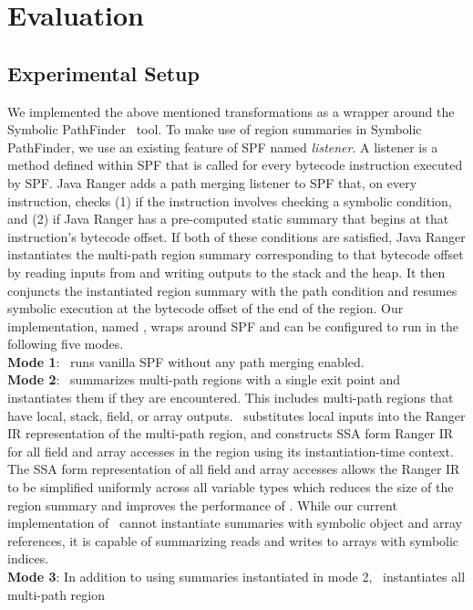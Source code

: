 \section{Evaluation}
\label{sec:results}
\subsection{Experimental Setup}
We implemented the above mentioned transformations as a wrapper around the Symbolic PathFinder~\cite{spf} tool.
%
To make use of region summaries in Symbolic PathFinder, we use an existing feature of SPF named \textit{listener}.
%
A listener is a method defined within SPF that is called for every bytecode instruction executed by SPF.
%
Java Ranger adds a path merging listener to SPF that, on every instruction, checks (1) if the instruction involves
checking a symbolic condition, and (2) if Java Ranger has a pre-computed static summary that begins at that
instruction\rq s bytecode offset.
%
If both of these conditions are satisfied, Java Ranger instantiates the multi-path region summary corresponding to that
bytecode offset by reading inputs from and writing outputs to the stack and the heap.
%
It then conjuncts the instantiated region summary with the path condition and resumes symbolic execution at the
bytecode offset of the end of the region.
%
Our implementation, named \tool, wraps around SPF and can be configured to run in the following five modes.\\
%
\textbf{Mode 1}: \tool\ runs vanilla SPF without any path merging enabled.\\
%
\textbf{Mode 2}: \tool\ summarizes multi-path regions with a single exit point and instantiates them if they are encountered.
This includes multi-path regions that have local, stack, field, or array outputs.
%
\tool\ substitutes local inputs into the Ranger IR representation of the multi-path region, and constructs SSA form
Ranger IR for all field and array accesses in the region using its instantiation-time context.
%
The SSA form representation of all field and array accesses allows the Ranger IR to be simplified uniformly across all
variable types which reduces the size of the region summary and improves the performance of \tool.
%
While our current implementation of \tool\ cannot instantiate summaries with symbolic object and array
references, it is capable of summarizing reads and writes to arrays with symbolic indices.\\
%
\textbf{Mode 3}: In addition to using summaries instantiated in mode 2, \tool\ instantiates all multi-path region
